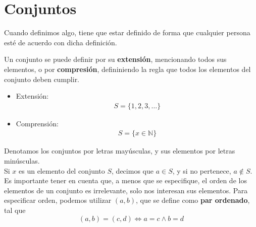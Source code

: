\documentclass{../Topologia.tex}
\begin{document}
\section{Conjuntos}
Cuando definimos algo, tiene que estar definido de forma que cualquier persona
esté de acuerdo con dicha definición.
\begin{defin}
	Un conjunto se puede definir por su \textbf{extensión}, mencionando todos
	sus elementos, o por \textbf{compresión}, defininiendo la regla que todos
	los elementos del conjunto deben cumplir.
	\begin{itemize}
		\item Extensión:\\
			\begin{equation}
				\begin{split}
					S = \{ 1,2,3,\dots  \}
				\end{split}
			\end{equation}
		\item Comprensión:\\
			\begin{equation}
				\begin{split}
					S = \{ x \in \mathbb{N} \}
				\end{split}
			\end{equation}
	\end{itemize}
	Denotamos los conjuntos por letras mayúsculas, y sus elementos por letras
	minúsculas.\\
	Si $x$ es un elemento del conjunto $S$, decimos que $a \in S$, y si no
	pertenece, $a \notin S$. Es importante tener en cuenta que, a menos que se
	especifique, el orden de los elementos de un conjunto es irrelevante, solo nos
	interesan sus elementos. Para especificar orden, podemos utilizar $(a,b)$,
	que se define como \textbf{par ordenado}, tal que
	\[
		(a,b) = (c,d) \iff a=c \wedge b = d
	\]
\end{defin}
\end{document}
